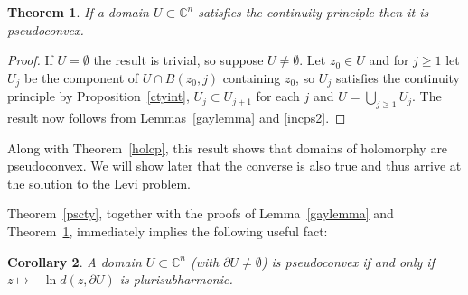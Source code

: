 \documentclass[11pt,a4paper, final, twoside]{article}
\newtheorem{theorem}{Theorem}
\newtheorem{corollary}[theorem]{Corollary}
\numberwithin{equation}{section}
\newcommand{\C}{\mathbb C}
\newcommand{\bd}{\partial}
\newcommand{\ball}{B}
\newcommand{\emetric}{d}
\begin{document}
\begin{theorem}
\label{ctyps}
If a domain $U\subset\C^n$ satisfies the continuity principle then it is pseudoconvex.
\end{theorem}
\begin{proof}
If $U=\emptyset$ the result is trivial, so suppose $U\neq\emptyset$. Let $z_0\in U$ and for $j\geq 1$ let $U_j$ be the component of $U\cap\ball(z_0,j)$ containing $z_0$, so $U_j$ satisfies
the continuity principle by Proposition~\ref{ctyint}, $U_j\subset U_{j+1}$ for each $j$ and $U=\bigcup_{j\geq 1} U_j$. The result now follows from Lemmas~\ref{gaylemma} and \ref{incps2}.
\end{proof}
Along with Theorem~\ref{holcp}, this result shows that domains of holomorphy are pseudoconvex. We will show later that the converse is also true and thus arrive at the solution to the Levi problem. 

Theorem~\ref{pscty}, together with the proofs of Lemma~\ref{gaylemma} and Theorem~\ref{ctyps}, immediately implies the following useful fact:
\begin{corollary}
A domain $U\subset\C^n$ (with $\bd U\neq\emptyset$) is pseudoconvex if and only if $z\mapsto -\ln\emetric(z,\bd U)$ is plurisubharmonic.
\end{corollary}
\end{document}
